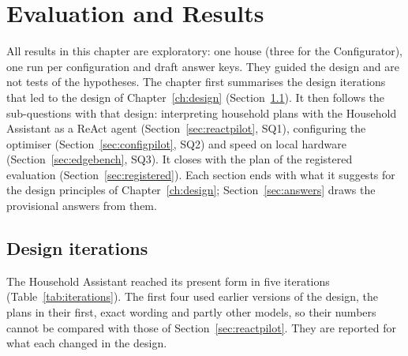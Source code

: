 \chapter{Evaluation and Results}
\label{ch:results}

All results in this chapter are exploratory: one house (three for the
Configurator), one run per configuration and draft answer keys. They guided the design and are not
tests of the hypotheses. The chapter first summarises the design
iterations that led to the design of Chapter~\ref{ch:design}
(Section~\ref{sec:iterations}). It then follows the sub-questions with
that design: interpreting household plans with the Household Assistant
as a ReAct agent (Section~\ref{sec:reactpilot}, SQ1), configuring the
optimiser (Section~\ref{sec:configpilot}, SQ2) and speed on local
hardware (Section~\ref{sec:edgebench}, SQ3). It closes with the plan of
the registered evaluation (Section~\ref{sec:registered}). Each section
ends with what it suggests for the design principles of
Chapter~\ref{ch:design}; Section~\ref{sec:answers} draws the
provisional answers from them.

\section{Design iterations}
\label{sec:iterations}

The Household Assistant reached its present form in five iterations
(Table~\ref{tab:iterations}). The first four used earlier versions of
the design, the plans in their first, exact wording and partly other
models, so their numbers cannot be compared with those of
Section~\ref{sec:reactpilot}. They are reported for what each changed
in the design.

